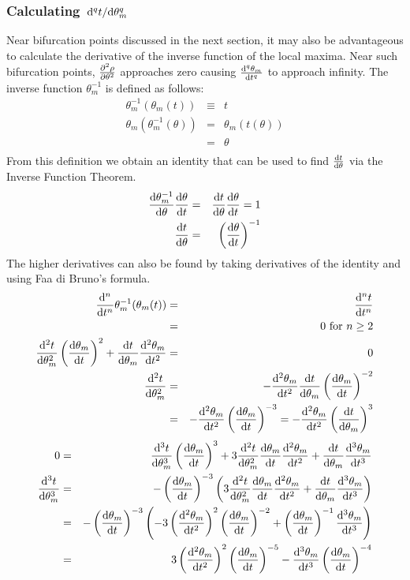 \documentclass[11pt]{article} %
\begin{document}
\subsubsection{Calculating $ \dv*[q]{t}{\theta_m} $}

Near bifurcation points discussed in the next section, it may also be advantageous to calculate the derivative of the inverse function of the local maxima. Near such bifurcation points, $ \pdv[2]{\rho}{\theta} $ approaches zero causing $ \dv[q]{\theta_m}{t} $ to approach infinity. The inverse function $ \theta_m^{-1} $ is defined as follows:
\begin{eqnarray}
	\theta_m^{-1}(\theta_m(t)) & \equiv & t \\
	\theta_m(\theta_m^{-1}(\theta)) & = & \theta_m(t(\theta)) \\
	& = & \theta \\
\end{eqnarray}
From this definition we obtain an identity that can be used to find $ \dv{t}{\theta} $ via the Inverse Function Theorem.
\begin{eqnarray}
	\dv{\theta_m^{-1}}{\theta} \dv{\theta}{t} & = & \dv{t}{\theta} \dv{\theta}{t} = 1 \\
	\dv{t}{\theta} & = & \left( \dv{\theta}{t} \right)^{-1}
\end{eqnarray}
The higher derivatives can also be found by taking derivatives of the identity and using Faa di Bruno's formula.
\begin{eqnarray}
	\dv[n]{}{t} \theta_m^{-1}(\theta_m(t)) & = & \dv[n]{t}{t} \\
	& = & 0 \mbox{ for } n \ge 2 \\
	\dv[2]{t}{\theta_m} \left(\dv{\theta_m}{t}\right)^2 + \dv{t}{\theta_m}\dv[2]{\theta_m}{t} & = & 0 \\
	\dv[2]{t}{\theta_m} & = & -\dv[2]{\theta_m}{t} \dv{t}{\theta_m} \left( \dv{\theta_m}{t} \right)^{-2} \\
	& = & -\dv[2]{\theta_m}{t} \left( \dv{\theta_m}{t} \right)^{-3} = -\dv[2]{\theta_m}{t} \left( \dv{t}{\theta_m} \right)^{3} \\
\end{eqnarray}
\begin{eqnarray}
	0 & = & \dv[3]{t}{\theta_m} \left( \dv{\theta_m}{t} \right)^3 + 3 \dv[2]{t}{\theta_m} \dv{\theta_m}{t} \dv[2]{\theta_m}{t} + \dv{t}{\theta_m} \dv[3]{\theta_m}{t}  \\
	\dv[3]{t}{\theta_m} & = & -\left( \dv{\theta_m}{t} \right)^{-3} \left( 3 \dv[2]{t}{\theta_m} \dv{\theta_m}{t} \dv[2]{\theta_m}{t} + \dv{t}{\theta_m} \dv[3]{\theta_m}{t} \right) \\
	& = & -\left( \dv{\theta_m}{t} \right)^{-3} \left( -3 \left( \dv[2]{\theta_m}{t} \right)^2 \left( \dv{\theta_m}{t} \right)^{-2}  + \left( \dv{\theta_m}{t} \right)^{-1} \dv[3]{\theta_m}{t} \right) \\
	& = & 3 \left( \dv[2]{\theta_m}{t} \right)^2 \left( \dv{\theta_m}{t} \right)^{-5}  - \dv[3]{\theta_m}{t} \left( \dv{\theta_m}{t} \right)^{-4} 
\end{eqnarray}
\end{document}
